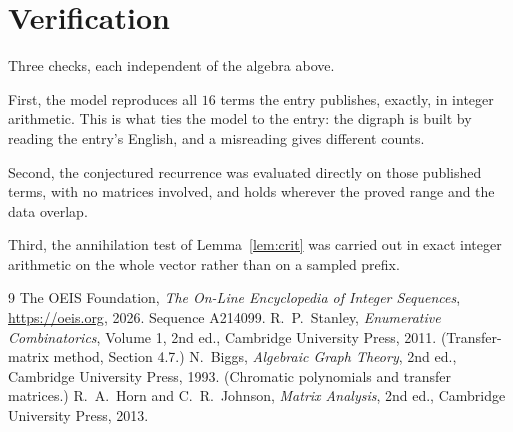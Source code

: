 \documentclass[11pt,a4paper]{article}
\theoremstyle{plain}
\theoremstyle{definition}
\begin{document}
\section{Verification}

Three checks, each independent of the algebra above.

First, the model reproduces all $16$ terms the entry publishes, exactly, in integer
arithmetic. This is what ties the model to the entry: the digraph is built by reading the
entry's English, and a misreading gives different counts.

Second, the conjectured recurrence was evaluated directly on those published terms, with no
matrices involved, and holds wherever the proved range and the data overlap.

Third, the annihilation test of Lemma~\ref{lem:crit} was carried out in exact integer
arithmetic on the whole vector rather than on a sampled prefix.

\begin{thebibliography}{9}
 The OEIS Foundation, \emph{The On-Line Encyclopedia of Integer
Sequences}, \url{https://oeis.org}, 2026. Sequence A214099.
 R.~P.~Stanley, \emph{Enumerative Combinatorics}, Volume 1, 2nd ed.,
Cambridge University Press, 2011. (Transfer-matrix method, Section 4.7.)
 N.~Biggs, \emph{Algebraic Graph Theory}, 2nd ed., Cambridge University
Press, 1993. (Chromatic polynomials and transfer matrices.)
 R.~A.~Horn and C.~R.~Johnson, \emph{Matrix Analysis}, 2nd ed., Cambridge
University Press, 2013.
\end{thebibliography}
\end{document}
